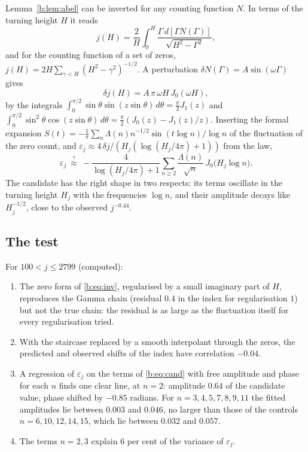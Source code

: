Lemma~\ref{b:lem:abel} can be inverted for any counting function $N$. In terms of the turning height $H$ it reads
\begin{equation}\label{b:eq:inv}
j(H)=\frac2H\int_0^H\frac{\Gamma\,d[\Gamma N(\Gamma)]}{\sqrt{H^2-\Gamma^2}} ,
\end{equation}
and for the counting function of a set of zeros, $j(H)=2H\sum_{\gamma<H}(H^2-\gamma^2)^{-1/2}$. A perturbation $\delta N(\Gamma)=A\sin(\omega\Gamma)$ gives
\[
\delta j(H)=A\,\pi\,\omega H\,J_0(\omega H),
\]
by the integrals $\int_0^{\pi/2}\sin\theta\sin(z\sin\theta)\,d\theta=\frac\pi2J_1(z)$ and $\int_0^{\pi/2}\sin^2\theta\cos(z\sin\theta)\,d\theta=\allowbreak\frac\pi2(J_0(z)-J_1(z)/z)$. Inserting the formal expansion $S(t)=\allowbreak-\frac1\pi\allowbreak\sum_n\Lambda(n)n^{-1/2}\allowbreak\sin(t\log n)/\log n$ of the fluctuation of the zero count, and $\varepsilon_j\approx\allowbreak4\,\delta j\allowbreak/\allowbreak(H_j(\log(H_j/4\pi)+1))$ from the law,
\begin{equation}\label{b:eq:cand}
\varepsilon_j\ \overset{?}{\approx}\
-\frac{4}{\log(H_j/4\pi)+1}\sum_{n\ge2}\frac{\Lambda(n)}{\sqrt n}\,
J_0\bigl(H_j\log n\bigr).
\end{equation}
The candidate has the right shape in two respects: its terms oscillate in the turning height $H_j$ with the frequencies $\log n$, and their amplitude decays like $H_j^{-1/2}$, close to the observed $j^{-0.44}$.

\subsection{The test}

\begin{remark}\label{b:comp:prime}
For $100<j\le2799$ (computed):
\begin{enumerate}
\item The zero form of \eqref{b:eq:inv}, regularised by a small imaginary part of $H$, reproduces the Gamma chain (residual $0.4$ in the index for regularisation $1$) but not the true chain: the residual is as large as the fluctuation itself for every regularisation tried.
\item With the staircase replaced by a smooth interpolant through the zeros, the predicted and observed shifts of the index have correlation $-0.04$.
\item A regression of $\varepsilon_j$ on the terms of \eqref{b:eq:cand} with free amplitude and phase for each $n$ finds one clear line, at $n=2$: amplitude $0.64$ of the candidate value, phase shifted by $-0.85$ radians. For $n=3,4,5,7,8,9,11$ the fitted amplitudes lie between $0.003$ and $0.046$, no larger than those of the controls $n=6,10,12,14,15$, which lie between $0.032$ and $0.057$.
\item The terms $n=2,3$ explain $6$ per cent of the variance of $\varepsilon_j$.
\end{enumerate}
\end{remark}

